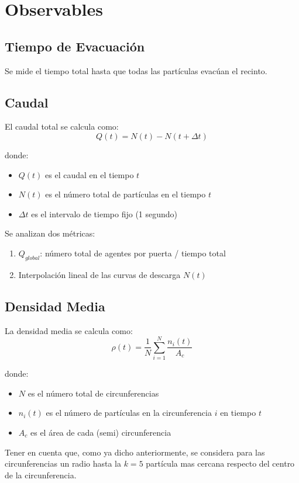 \documentclass[12pt]{article}
\begin{document}
\section{Observables}

\subsection{Tiempo de Evacuación}
Se mide el tiempo total hasta que todas las partículas evacúan el recinto.

\subsection{Caudal}
El caudal total se calcula como:
\begin{equation}
Q(t) = N(t) - N(t + \Delta t)
\end{equation}

donde:
\begin{itemize}
    \item $Q(t)$ es el caudal en el tiempo $t$
    \item $N(t)$ es el número total de partículas en el tiempo $t$
    \item $\Delta t$ es el intervalo de tiempo fijo (1 segundo)
\end{itemize}

Se analizan dos métricas:
\begin{enumerate}
    \item $Q_{global}$: número total de agentes por puerta / tiempo total
    \item Interpolación lineal de las curvas de descarga $N(t)$
\end{enumerate}

\subsection{Densidad Media}
La densidad media se calcula como:
\begin{equation}
\rho(t) = \frac{1}{N} \sum_{i=1}^{N} \frac{n_i(t)}{A_c}
\end{equation}

donde:
\begin{itemize}
    \item $N$ es el número total de circunferencias
    \item $n_i(t)$ es el número de partículas en la circunferencia $i$ en tiempo $t$
    \item $A_c$ es el área de cada (semi) circunferencia
\end{itemize}
Tener en cuenta que, como ya dicho anteriormente, se considera para las circunferencias un radio hasta la $k=5$ partícula mas cercana respecto del centro de la circunferencia.
\end{document}
